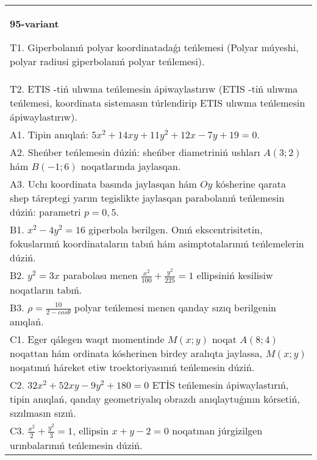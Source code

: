 \documentclass{article}
\begin{document}
\begin{tabular}{m{17cm}}
\textbf{95-variant}
\newline

T1. Giperbolanıń polyar koordinatadaǵı teńlemesi (Polyar múyeshi, polyar radiusi giperbolanıń polyar teńlemesi).\\

T2. ETIS -tiń ulıwma teńlemesin ápiwaylastırıw (ETIS -tiń ulıwma teńlemesi, koordinata sistemasın túrlendirip ETIS ulıwma teńlemesin ápiwaylastırıw).\\

A1. Tipin anıqlań: $5 x^{2}+14 xy+11 y^{2}+12 x-7 y+19=0$.\\

A2. Sheńber teńlemesin dúziń: sheńber diametriniń ushları $A (3;2) $ hám $B (-1;6 ) $ noqatlarında jaylasqan.\\

A3. Uchı koordinata basında jaylasqan hám $Oy$ kósherine qarata shep táreptegi yarım tegislikte jaylasqan parabolanıń teńlemesin dúziń: parametri $p=0,5$.\\

B1. $x^{2} - 4y^{2} = 16$ giperbola berilgen. Onıń ekscentrisitetin, fokuslarınıń koordinataların tabıń hám asimptotalarınıń teńlemelerin dúziń.\\

B2. $y^{2} = 3x$ parabolası menen $\frac{x^{2}}{100} + \frac{y^{2}}{225} = 1$ ellipsiniń kesilisiw noqatların tabıń.  \\

B3. $\rho = \frac{10}{2 - cos\theta}$ polyar teńlemesi menen qanday sızıq berilgenin anıqlań.  \\

C1. Eger qálegen waqıt momentinde $M(x;y)$ noqat $A(8;4)$ noqattan hám ordinata kósherinen birdey aralıqta jaylassa, $M(x;y)$ noqatınıń háreket etiw troektoriyasınıń teńlemesin dúziń.  \\

C2. $32x^{2} + 52xy - 9y^{2} + 180 = 0$ ETİS teńlemesin ápiwaylastırıń, tipin anıqlań, qanday geometriyalıq obrazdı anıqlaytuǵının kórsetiń, sızılmasın sızıń.  \\

C3. $\frac{x^{2}}{2} + \frac{y^{2}}{3} = 1$, ellipsin $x + y - 2 = 0$ noqatınan júrgizilgen urınbalarınıń teńlemesin dúziń.  \\

\end{tabular}
\vspace{1cm}
\end{document}
